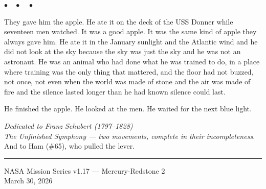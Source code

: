 \documentclass[12pt, letterpaper]{article}
\begin{document}
\begin{center}
$\bullet\quad\bullet\quad\bullet$
\end{center}

They gave him the apple. He ate it on the deck of the USS Donner while seventeen men watched. It was a good apple. It was the same kind of apple they always gave him. He ate it in the January sunlight and the Atlantic wind and he did not look at the sky because the sky was just the sky and he was not an astronaut. He was an animal who had done what he was trained to do, in a place where training was the only thing that mattered, and the floor had not buzzed, not once, not even when the world was made of stone and the air was made of fire and the silence lasted longer than he had known silence could last.

He finished the apple. He looked at the men. He waited for the next blue light.

\vspace{2em}
\begin{center}
\textit{Dedicated to Franz Schubert (1797--1828)}\\[0.3em]
\textit{The Unfinished Symphony --- two movements, complete in their incompleteness.}\\[0.3em]
And to Ham (\#65), who pulled the lever.
\end{center}

\vspace{1em}
\noindent\rule{\textwidth}{0.4pt}
\begin{center}
\small NASA Mission Series v1.17 --- Mercury-Redstone 2\\
\small March 30, 2026
\end{center}
\end{document}
